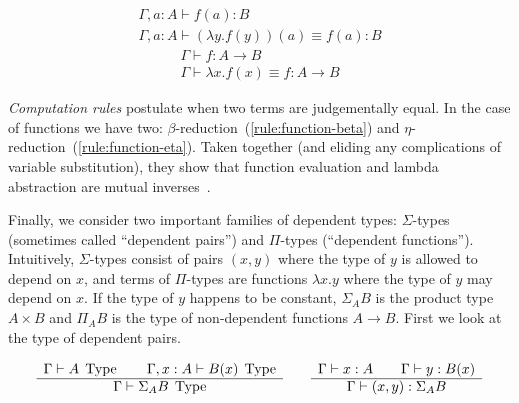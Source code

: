 \begin{equation}
  \begin{array}{c}
    \Gamma, a : A \vdash f(a) : B\\
    \hline
    \Gamma, a : A \vdash (\lambda y . f(y))(a) \equiv f(a) : B
  \end{array}
  \label{rule:function-beta}
\end{equation}
\begin{equation}
  \begin{array}{c}
    \Gamma \vdash f : A \rightarrow B\\
    \hline
    \Gamma \vdash \lambda x. f(x) \equiv f : A \rightarrow B
  \end{array}
  \label{rule:function-eta}
\end{equation}

\emph{Computation rules} postulate when two terms are judgementally equal. In
the case of functions we have two: $\beta$-reduction~(\ref{rule:function-beta})
and $\eta$-reduction~(\ref{rule:function-eta}). Taken together (and eliding any
complications of variable substitution), they show that
function evaluation and lambda abstraction are mutual inverses~\cite{Rijke2019}.

Finally, we consider two important families of dependent types: $\Sigma$-types
(sometimes called ``dependent pairs'') and $\Pi$-types (``dependent
functions''). Intuitively, $\Sigma$-types consist of pairs $(x,y)$ where the
type of $y$ is allowed to depend on $x$, and terms of $\Pi$-types are functions
$\lambda x . y$ where the type of $y$ may depend on $x$. If the type of $y$
happens to be constant, $\Sigma_A B$ is the product type $A \times B$ and
$\Pi_A B$ is the type of non-dependent functions $A \rightarrow B$. First we
look at the type of dependent pairs.

\begin{equation*}
  \begin{array}[t]{c}
    \Gamma \vdash A \; \operatorname{Type} \qquad \Gamma, x:A \vdash B(x) \; \operatorname{Type}\\
    \hline
    \Gamma \vdash \Sigma_A B \; \operatorname{Type}\\
  \end{array}
  \qquad
  \begin{array}[t]{c}
    \Gamma \vdash x:A \qquad \Gamma \vdash y : B(x)\\
    \hline
    \Gamma \vdash (x , y) : \Sigma_A B
  \end{array}
\end{equation*}

